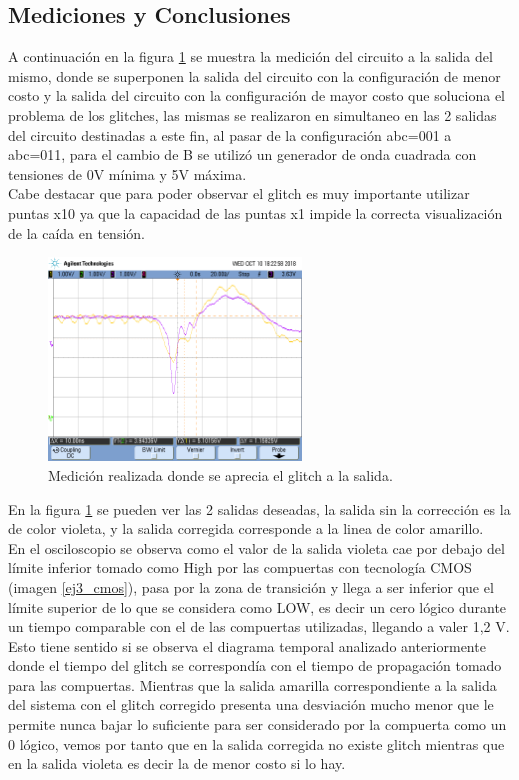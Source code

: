 \subsection{Mediciones y Conclusiones}
\noindent
A continuación en la figura \ref{ej3_medicion} se muestra la medición del circuito a la salida del mismo, donde se superponen la salida del circuito con la configuración de menor costo y la salida del circuito con la configuración de mayor costo que soluciona el problema de los glitches, las mismas se realizaron en simultaneo en las 2 salidas del circuito destinadas a este fin, al pasar de la configuración abc=001 a abc=011, para el cambio de B se utilizó un generador de onda cuadrada con tensiones de 0V mínima y 5V máxima.\\ Cabe destacar que para poder observar el glitch es muy importante utilizar puntas x10 ya que la capacidad de las puntas x1 impide la correcta visualización de la caída en tensión.
%
\begin{figure}[H]
    \centering
        \centering
        \includegraphics[width=0.6\textwidth]{figs/Ej3/x10_se_ve_glitchesito_ojo_limit_oscil.png} %
         \caption{Medición realizada donde se aprecia el glitch a la salida.}
         \label{ej3_medicion}
\end{figure}
%
\noindent
En la figura \ref{ej3_medicion} se pueden ver las 2 salidas deseadas, la salida sin la corrección es la de color violeta, y la salida corregida corresponde a la linea de color amarillo.\\
En el osciloscopio se observa como el valor de la salida violeta cae por debajo del límite inferior tomado como High por las compuertas con tecnología CMOS (imagen \ref{ej3_cmos}), pasa por la zona de transición y llega a ser inferior que el límite superior de lo que se considera como LOW, es decir un cero lógico durante un tiempo comparable con el de las compuertas utilizadas, llegando a valer 1,2 V. Esto tiene sentido si se observa el diagrama temporal analizado anteriormente donde el tiempo del glitch se correspondía con el tiempo de propagación tomado para las compuertas. Mientras que la salida amarilla correspondiente a la salida del sistema con el glitch corregido presenta una desviación mucho menor que le permite nunca bajar lo suficiente para ser considerado por la compuerta como un 0 lógico, vemos por tanto que en la salida corregida no existe glitch mientras que en la salida violeta es decir la de menor costo si lo hay.
